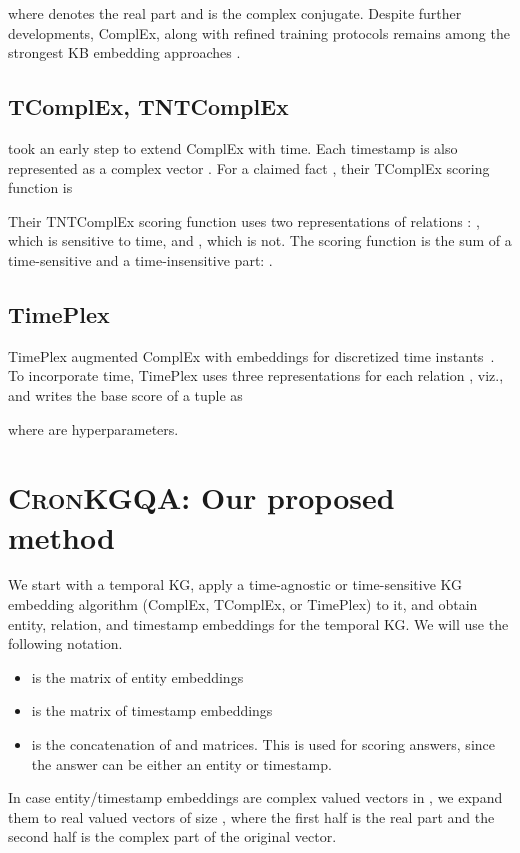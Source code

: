 \documentclass[11pt,a4paper]{article}
\newcommand{\method}{\textsc{CronKGQA}}
\begin{document}
where  denotes the real part and  is the complex conjugate.  Despite further developments, ComplEx, along with refined training protocols \citep{lacroix2018canonical} remains among the strongest KB embedding approaches \citep{Ruffinelli2020You}.


\subsection{TComplEx, TNTComplEx}
\label{sec:tcomplex}

\citet{lacroix2020tntcomplex} took an early step to extend ComplEx with time. Each timestamp  is also represented as a complex vector . For a claimed fact , their TComplEx scoring function is

Their TNTComplEx scoring function uses two representations of relations : , which is sensitive to time, and , which is not.  The scoring function is the sum of a time-sensitive and a time-insensitive part: .



\subsection{TimePlex}

TimePlex \citep{jain-etal-2020-temporal} augmented ComplEx with embeddings  for discretized time instants~.  To incorporate time, TimePlex uses three representations for each relation , viz.,  and writes the base score of a tuple  as 

where  are hyperparameters.  


\section{\method{}: Our proposed method}
\label{sec:TembedKGQA}



We start with a temporal KG, apply a time-agnostic or time-sensitive KG embedding algorithm (ComplEx, TComplEx, or TimePlex) to it, and obtain entity, relation, and timestamp embeddings for the temporal KG. We will use the following notation.
\begin{itemize}
    \item  is the matrix of entity embeddings
    \item  is the matrix of timestamp embeddings
    \item  is the concatenation of  and  matrices. This is used for scoring answers, since the answer can be either an entity or timestamp.
\end{itemize}
In case entity/timestamp embeddings are complex valued vectors in , we expand them to real valued vectors of size , where the first half is the real part and the second half is the complex part of the original vector.
\end{document}

